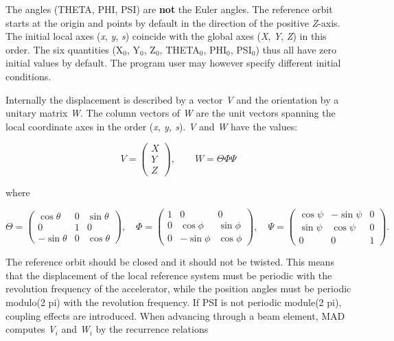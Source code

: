 The angles (THETA, PHI, PSI) are \textbf{not} the Euler angles. The
reference orbit starts at the origin and points by default in the
direction of the positive \textit{Z}-axis. The initial local axes
(\textit{x}, \textit{y}, \textit{s})  coincide with the global axes
(\textit{X}, \textit{Y}, \textit{Z}) in this order. The six quantities
(X$_0$, Y$_0$, Z$_0$, THETA$_0$, PHI$_0$, PSI$_0$) thus all have zero
initial values by default. The program user may however specify
different initial conditions.  

Internally the displacement is described by a vector \textit{V} and the
orientation by a unitary matrix \textit{W}. The column vectors of
\textit{W} are the unit vectors spanning  the local coordinate axes in
the order (\textit{x, y, s}). \textit{V} and \textit{W} have the values:  


\[
V =
 \begin{pmatrix}
  X \\
  Y \\
  Z
 \end{pmatrix}
, \quad\quad
W=\Theta \Phi \Psi
\]

 where 

\[
\Theta =
 \begin{pmatrix}
  \cos \theta  & 0 &  \sin \theta \\
  0            & 1 &  0 \\
  -\sin \theta & 0 &  \cos \theta
 \end{pmatrix}
, \quad
\Phi =
 \begin{pmatrix}
  1 & 0          &  0 \\
  0 & \cos \phi  &  \sin \phi \\
  0 & -\sin \phi &  \cos \phi
 \end{pmatrix}
, \quad
\Psi =
 \begin{pmatrix}
  \cos \psi &  -\sin \psi & 0 \\
  \sin \psi &  \cos \psi  & 0 \\
  0	    &	0	  & 1 
 \end{pmatrix}
.
\]

The reference orbit should be closed and it should not be twisted. This
means that the displacement of the local reference system must be
periodic with the revolution frequency of the accelerator, while the
position angles must be periodic modulo(2 pi) with the revolution
frequency. If PSI is not periodic module(2 pi), coupling effects are
introduced. When advancing through a beam element, MAD computes
\textit{V$_i$} and \textit{W$_i$} by the recurrence relations  

